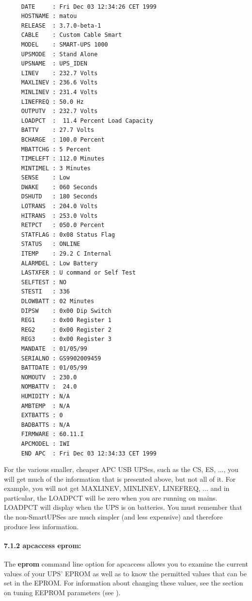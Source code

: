\footnotesize
\begin{verbatim}
     
     DATE     : Fri Dec 03 12:34:26 CET 1999
     HOSTNAME : matou
     RELEASE  : 3.7.0-beta-1
     CABLE    : Custom Cable Smart
     MODEL    : SMART-UPS 1000
     UPSMODE  : Stand Alone
     UPSNAME  : UPS_IDEN
     LINEV    : 232.7 Volts
     MAXLINEV : 236.6 Volts
     MINLINEV : 231.4 Volts
     LINEFREQ : 50.0 Hz
     OUTPUTV  : 232.7 Volts
     LOADPCT  :  11.4 Percent Load Capacity
     BATTV    : 27.7 Volts
     BCHARGE  : 100.0 Percent
     MBATTCHG : 5 Percent
     TIMELEFT : 112.0 Minutes
     MINTIMEL : 3 Minutes
     SENSE    : Low
     DWAKE    : 060 Seconds
     DSHUTD   : 180 Seconds
     LOTRANS  : 204.0 Volts
     HITRANS  : 253.0 Volts
     RETPCT   : 050.0 Percent
     STATFLAG : 0x08 Status Flag
     STATUS   : ONLINE
     ITEMP    : 29.2 C Internal
     ALARMDEL : Low Battery
     LASTXFER : U command or Self Test
     SELFTEST : NO
     STESTI   : 336
     DLOWBATT : 02 Minutes
     DIPSW    : 0x00 Dip Switch
     REG1     : 0x00 Register 1
     REG2     : 0x00 Register 2
     REG3     : 0x00 Register 3
     MANDATE  : 01/05/99
     SERIALNO : GS9902009459
     BATTDATE : 01/05/99
     NOMOUTV  : 230.0
     NOMBATTV :  24.0
     HUMIDITY : N/A
     AMBTEMP  : N/A
     EXTBATTS : 0
     BADBATTS : N/A
     FIRMWARE : 60.11.I
     APCMODEL : IWI
     END APC  : Fri Dec 03 12:34:33 CET 1999
\end{verbatim}
\normalsize

For the various smaller, cheaper APC USB UPSes, such as the CS, ES, ..., you
will get much of the information that is presented above, but not all of it.
For example, you will not get MAXLINEV, MINLINEV, LINEFREQ, ... and in
particular, the LOADPCT will be zero when you are running on mains. LOADPCT
will display when the UPS is on batteries.  You must remember that the
non-SmartUPSes are much simpler (and less expensive) and therefore produce
less information. 

\label{apcaccess-eprom}

\paragraph*{7.1.2 apcaccess eprom:}

\label{index-apcaccess-eeprom-114}
\label{index-eeprom_002c-apcaccess-115}
The {\bf eprom} command line option for apcaccess allows you to examine the
current values of your UPS' EPROM as well as to know the permitted values that
can be set in the EPROM. For information about changing these values, see the
section on tuning EEPROM parameters (see 
).  


